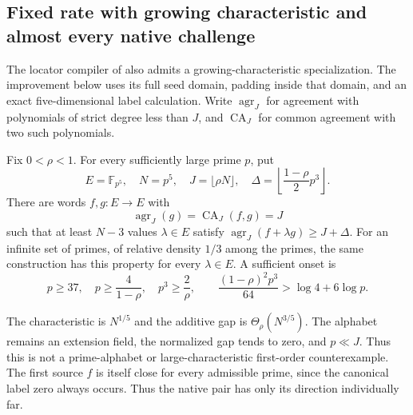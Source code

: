 \subsection{Fixed rate with growing characteristic and almost every native challenge}
\label{subsec:growing-characteristic-native}

The locator compiler of \cite{binary-counterexamples} also admits a growing-characteristic specialization.  The improvement below uses its full seed domain, padding inside that domain, and an exact five-dimensional label calculation.  Write $\operatorname{agr}_J$ for agreement with polynomials of strict degree less than $J$, and $\operatorname{CA}_J$ for common agreement with two such polynomials.

\begin{theorem}\label{thm:growing-characteristic-native}
Fix $0<\rho<1$. For every sufficiently large prime $p$, put
\[
 E=\mathbb F_{p^5},\quad N=p^5,\quad J=\lfloor\rho N\rfloor,
 \quad \Delta=\left\lfloor\frac{1-\rho}{2}p^3\right\rfloor.
\]
There are words $f,g:E\to E$ with
\[
 \operatorname{agr}_J(g)=\operatorname{CA}_J(f,g)=J
\]
such that at least $N-3$ values $\lambda\in E$ satisfy
$\operatorname{agr}_J(f+\lambda g)\ge J+\Delta$.
For an infinite set of primes, of relative density $1/3$ among the primes, the same construction has this property for every $\lambda\in E$.
A sufficient onset is
\[
 p\ge37,\quad p\ge\frac4{1-\rho},\quad p^3\ge\frac2\rho,
 \qquad \frac{(1-\rho)^2p^3}{64}>\log4+6\log p.
\]
\end{theorem}

The characteristic is $N^{1/5}$ and the additive gap is
$\Theta_\rho(N^{3/5})$.  The alphabet remains an extension field, the normalized gap tends to zero, and $p\ll J$.  Thus this is not a prime-alphabet or large-characteristic first-order counterexample.  The first source $f$ is itself close for every admissible prime, since the canonical label zero always occurs. Thus the native pair has only its direction individually far.

